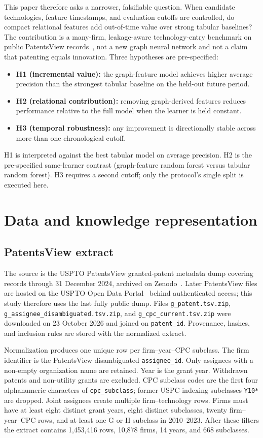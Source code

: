 \documentclass[preprint,12pt,3p]{elsarticle}
\begin{document}
This paper therefore asks a narrower, falsifiable question. When candidate technologies, feature timestamps, and evaluation cutoffs are controlled, do compact relational features add out-of-time value over strong tabular baselines? The contribution is a many-firm, leakage-aware technology-entry benchmark on public PatentsView records~\cite{uspto2025,uspto2026}, not a new graph neural network and not a claim that patenting equals innovation. Three hypotheses are pre-specified:
\begin{itemize}
\item \textbf{H1 (incremental value):} the graph-feature model achieves higher average precision than the strongest tabular baseline on the held-out future period.
\item \textbf{H2 (relational contribution):} removing graph-derived features reduces performance relative to the full model when the learner is held constant.
\item \textbf{H3 (temporal robustness):} any improvement is directionally stable across more than one chronological cutoff.
\end{itemize}
H1 is interpreted against the best tabular model on average precision. H2 is the pre-specified same-learner contrast (graph-feature random forest versus tabular random forest). H3 requires a second cutoff; only the protocol's single split is executed here.

\section{Data and knowledge representation}
\label{sec:data}

\subsection{PatentsView extract}
The source is the USPTO PatentsView granted-patent metadata dump covering records through 31 December 2024, archived on Zenodo~\cite{uspto2025}. Later PatentsView files are hosted on the USPTO Open Data Portal~\cite{uspto2026} behind authenticated access; this study therefore uses the last fully public dump. Files \texttt{g\_patent.tsv.zip}, \texttt{g\_assignee\_disambiguated.tsv.zip}, and \texttt{g\_cpc\_current.tsv.zip} were downloaded on 23 October 2026 and joined on \texttt{patent\_id}. Provenance, hashes, and inclusion rules are stored with the normalized extract.

Normalization produces one unique row per firm--year--CPC subclass. The firm identifier is the PatentsView disambiguated \texttt{assignee\_id}. Only assignees with a non-empty organization name are retained. Year is the grant year. Withdrawn patents and non-utility grants are excluded. CPC subclass codes are the first four alphanumeric characters of \texttt{cpc\_subclass}; former-USPC indexing subclasses \texttt{Y10*} are dropped. Joint assignees create multiple firm--technology rows. Firms must have at least eight distinct grant years, eight distinct subclasses, twenty firm--year--CPC rows, and at least one G or H subclass in 2010--2023. After these filters the extract contains 1{,}453{,}416 rows, 10{,}878 firms, 14 years, and 668 subclasses.
\end{document}
